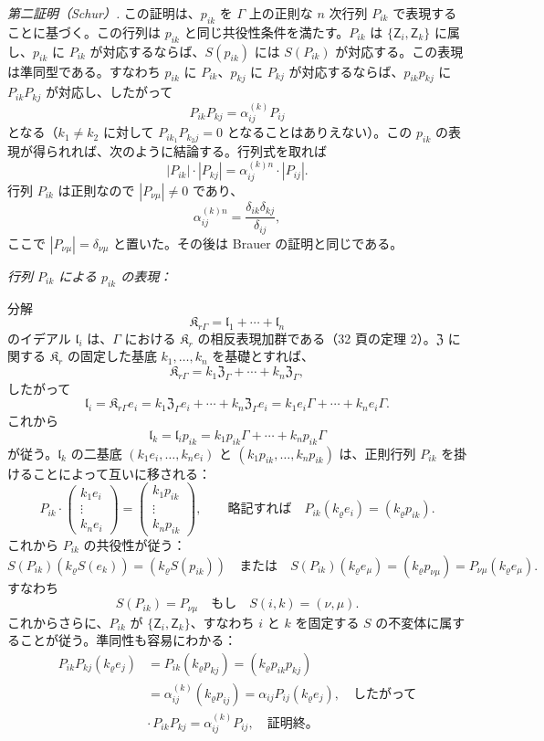 \emph{第二証明（Schur）.} この証明は、\(p_{ik}\) を \(\Gamma\) 上の正則な \(n\) 次行列 \(P_{ik}\) で表現することに基づく。この行列は \(p_{ik}\) と同じ共役性条件を満たす。\(P_{ik}\) は \(\{\mathsf{Z}_i,\mathsf{Z}_k\}\) に属し、\(p_{ik}\) に \(P_{ik}\) が対応するならば、\(S(p_{ik})\) には \(S(P_{ik})\) が対応する。この表現は準同型である。すなわち \(p_{ik}\) に \(P_{ik}\)、\(p_{kj}\) に \(P_{kj}\) が対応するならば、\(p_{ik}p_{kj}\) に \(P_{ik}P_{kj}\) が対応し、したがって
\[
P_{ik}P_{kj}=\alpha_{ij}^{(k)}P_{ij}
\]
となる（\(k_1\ne k_2\) に対して \(P_{ik_1}P_{k_2j}=0\) となることはありえない）。この \(p_{ik}\) の表現が得られれば、次のように結論する。行列式を取れば
\[
|P_{ik}|\cdot |P_{kj}|=\alpha_{ij}^{(k)n}\cdot |P_{ij}|.
\]
行列 \(P_{ik}\) は正則なので \(|P_{\nu\mu}|\ne0\) であり、
\[
\alpha_{ij}^{(k)n}=\frac{\delta_{ik}\delta_{kj}}{\delta_{ij}},
\]
ここで \(|P_{\nu\mu}|=\delta_{\nu\mu}\) と置いた。その後は Brauer の証明と同じである。

\emph{行列 \(P_{ik}\) による \(p_{ik}\) の表現：}

分解
\[
\mathfrak K_{r\Gamma}=\mathfrak l_1+\cdots+\mathfrak l_n
\]
のイデアル \(\mathfrak l_i\) は、\(\Gamma\) における \(\mathfrak K_r\) の相反表現加群である（32 頁の定理 2）。\(\mathfrak Z\) に関する \(\mathfrak K_r\) の固定した基底 \(k_1,\ldots,k_n\) を基礎とすれば、
\[
\mathfrak K_{r\Gamma}=k_1\mathfrak Z_\Gamma+\cdots+k_n\mathfrak Z_\Gamma,
\]
したがって
\[
\mathfrak l_i=\mathfrak K_{r\Gamma}e_i
=k_1\mathfrak Z_\Gamma e_i+\cdots+k_n\mathfrak Z_\Gamma e_i
=k_1e_i\Gamma+\cdots+k_ne_i\Gamma.
\]
これから
\[
\mathfrak l_k=\mathfrak l_i p_{ik}
=k_1p_{ik}\Gamma+\cdots+k_np_{ik}\Gamma
\]
が従う。\(\mathfrak l_k\) の二基底 \((k_1e_i,\ldots,k_ne_i)\) と \((k_1p_{ik},\ldots,k_np_{ik})\) は、正則行列 \(P_{ik}\) を掛けることによって互いに移される：
\[
P_{ik}\cdot
\begin{pmatrix}
k_1e_i\\ \vdots\\ k_ne_i
\end{pmatrix}
=
\begin{pmatrix}
k_1p_{ik}\\ \vdots\\ k_np_{ik}
\end{pmatrix},
\qquad
\text{略記すれば}\quad
P_{ik}(k_\varrho e_i)=(k_\varrho p_{ik}).
\]
これから \(P_{ik}\) の共役性が従う：
\[
S(P_{ik})(k_\varrho S(e_k))=(k_\varrho S(p_{ik}))
\quad\text{または}\quad
S(P_{ik})(k_\varrho e_\mu)=(k_\varrho p_{\nu\mu})
=P_{\nu\mu}(k_\varrho e_\mu).
\]
すなわち
\[
S(P_{ik})=P_{\nu\mu}\quad\text{もし}\quad S(i,k)=(\nu,\mu).
\]
これからさらに、\(P_{ik}\) が \(\{\mathsf{Z}_i,\mathsf{Z}_k\}\)、すなわち \(i\) と \(k\) を固定する \(S\) の不変体に属することが従う。準同性も容易にわかる：
\[
\begin{split}
P_{ik}P_{kj}(k_\varrho e_j)
&=P_{ik}(k_\varrho p_{kj})
=(k_\varrho p_{ik}p_{kj})\\
&=\alpha_{ij}^{(k)}(k_\varrho p_{ij})
=\alpha_{ij}P_{ij}(k_\varrho e_j),
\quad\text{したがって}\\
&\cdot\, P_{ik}P_{kj}=\alpha_{ij}^{(k)}P_{ij},
\quad\text{証明終。}
\end{split}
\]

